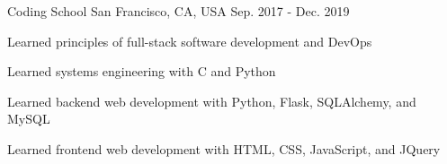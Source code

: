 

\begin{cventries}

	\cventry
	{} %
	{Coding School} %
	{San Francisco, CA, USA} %
	{Sep. 2017 - Dec. 2019} %
	{
		\begin{cvitems} %
			\item {Learned principles of full-stack software development and DevOps}
			\item {Learned systems engineering with C and Python}
			\item {Learned backend web development with Python, Flask, SQLAlchemy, and MySQL}
			\item {Learned frontend web development with HTML, CSS, JavaScript, and JQuery}
		\end{cvitems}
	}

\end{cventries}

